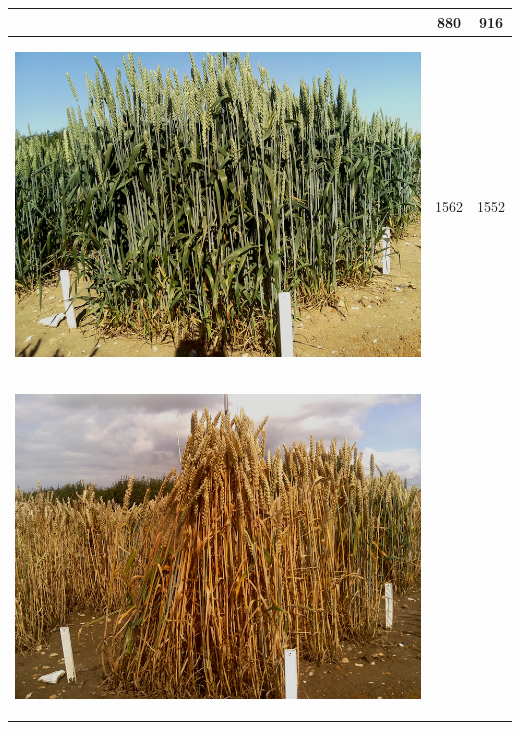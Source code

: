 \begin{table}[hp!]
\begin{tabular}{ | c | c | c | }
\begin{minipage}{.3\textwidth}
\begin{center}
      \end{center}
    \end{minipage}
    &
      880
    & 
      916
    \\ \hline
    \begin{minipage}{.3\textwidth}
      \begin{center}
		\includegraphics[width=\linewidth]{Images/005}
      \end{center}
    \end{minipage}
    &
      1562
    & 
      1552
    \\ \hline
    \begin{minipage}{.3\textwidth}
      \begin{center}
		\includegraphics[width=\linewidth]{Images/006}

\end{center}
\end{minipage}
\end{tabular}
\end{table}
